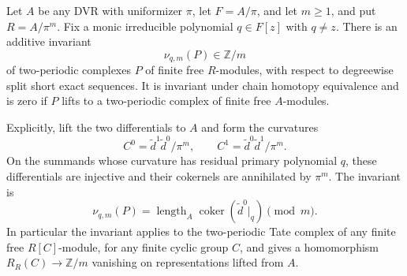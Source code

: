\begin{lemma}
\label{C:curvature_length}
Let $A$ be any DVR with uniformizer $\pi$, let $F=A/\pi$,
and let $m\ge1$,
and put $R=A/\pi^m$. Fix a monic irreducible polynomial
$q\in F[z]$ with $q\ne z$.
There is an additive invariant
\[
 \nu_{q,m}(P)\in\mathbb Z/m
\]
of two-periodic complexes $P$ of finite free $R$-modules, with
respect to degreewise split short exact sequences. It is invariant
under chain homotopy equivalence and is zero if $P$ lifts to a
two-periodic complex of finite free $A$-modules.

Explicitly, lift the two differentials to $A$ and form the
curvatures
\[
 C^0=\widetilde d^1\widetilde d^0/\pi^m,
 \qquad C^1=\widetilde d^0\widetilde d^1/\pi^m.
\]
On the summands whose curvature has residual primary polynomial
$q$, these differentials are injective and their cokernels are
annihilated by $\pi^m$. The invariant is
\[
 \nu_{q,m}(P)=
   \operatorname{length}_A
     \operatorname{coker}(\widetilde d^0|_q)\pmod m.
\]
In particular the invariant applies to the two-periodic Tate
complex of any finite free $R[C]$-module, for any finite cyclic
group $C$, and gives a homomorphism
$R_R(C)\to\mathbb Z/m$ vanishing on representations lifted from $A$.
\end{lemma}
